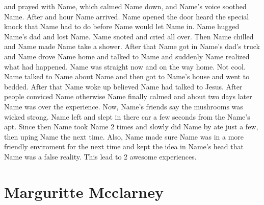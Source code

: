 \documentclass[12pt]{book}
\begin{document}
and prayed with Name, which calmed Name down, and Name's voice soothed Name. After and hour Name arrived. Name opened the door heard the special knock that Name had to do before Name would let Name in. Name hugged Name's dad and lost Name. Name snoted and cried all over. Then Name chilled and Name made Name take a shower. After that Name got in Name's dad's truck and Name drove Name home and talked to Name and suddenly Name realized what had happened. Name was straight now and on the way home. Not cool. Name talked to Name about Name and then got to Name's house and went to bedded. After that Name woke up believed Name had talked to Jesus. After people conviced Name otherwise Name finally calmed and about two days later Name was over the experience. Now, Name's friends say the mushrooms was wicked strong. Name left and slept in there car a few seconds from the Name's apt. Since then Name took Name 2 times and slowly did Name by ate just a few, then uping Name the next time. Also, Name made sure Name was in a more friendly enviroment for the next time and kept the idea in Name's head that Name was a false reality. This lead to 2 awesome experiences.



\chapter{Marguritte Mcclarney}
\end{document}
